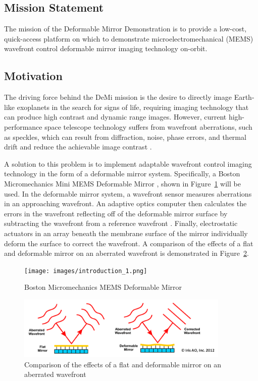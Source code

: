 \documentclass[12pt]{article}
\begin{document}
\subsection{Mission Statement}
The mission of the Deformable Mirror Demonstration is to provide a low-cost, quick-access platform on which to demonstrate microelectromechanical (MEMS) wavefront control deformable mirror imaging technology on-orbit.

\subsection{Motivation}
The driving force behind the DeMi mission is the desire to directly image Earth-like exoplanets in the search for signs of life, requiring imaging technology that can produce high contrast and dynamic range images.  However, current high-performance space telescope technology suffers from wavefront aberrations, such as speckles, which can result from diffraction, noise, phase errors, and thermal drift and reduce the achievable image contrast \cite{cahoy-unpublished}.

A solution to this problem is to implement adaptable wavefront control imaging technology in the form of a deformable mirror system. Specifically, a Boston Micromechanics
Mini MEMS Deformable Mirror \cite{bos-micro-demi}, shown in Figure~\ref{fig:Intro_demi} will be used. In the deformable mirror system, a wavefront sensor measures aberrations in an approaching wavefront. An adaptive optics computer then calculates the errors in the wavefront reflecting off of the deformable mirror surface by subtracting the wavefront from a reference wavefront \cite{adaptive-optics-overview}. Finally, electrostatic actuators in an array beneath the membrane surface of the mirror individually deform the surface to correct the wavefront. A comparison of the effects of a flat and deformable mirror on an aberrated wavefront is demonstrated in Figure~\ref{fig:Intro_wavefront}.   

\begin{figure}[!ht]
\centering
\texttt{[image: images/introduction\_1.png]}
\caption{Boston Micromechanics MEMS Deformable Mirror \cite{bos-micro-demi}}
\label{fig:Intro_demi}
\end{figure}

\begin{figure}[!ht]
\centering
\includegraphics[width=4in]{images/introduction_2.png}
\caption{Comparison of the effects of a flat and deformable mirror on an aberrated wavefront}
\label{fig:Intro_wavefront}
\end{figure}
\end{document}
